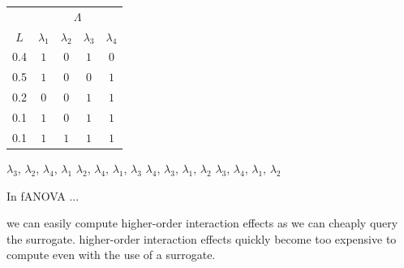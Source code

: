 \documentclass{exam}
\begin{document}
\begin{questions}
      \begin{tabular}{c|cccc}
          & \multicolumn{4}{c}{$\Lambda$} \\
          $L$ & $\lambda_1$ & $\lambda_2$ & $\lambda_3$ & $\lambda_4$ \\
          \hline %
          0.4 & $1$ & $0$ & $1$ & $0$ \\ %
          0.5 & $1$ & $0$ & $0$ & $1$ \\ %
          0.2 & $0$ & $0$ & $1$ & $1$ \\ %
          0.1 & $1$ & $0$ & $1$ & $1$ \\
          0.1 & $1$ & $1$ & $1$ & $1$ \\ %
      \end{tabular}
\begin{choices}
    \choice $\lambda_3$, $\lambda_2$, $\lambda_4$, $\lambda_1$
    \choice $\lambda_2$, $\lambda_4$, $\lambda_1$, $\lambda_3$
    \choice $\lambda_4$, $\lambda_3$, $\lambda_1$, $\lambda_2$
    \choice $\lambda_3$, $\lambda_4$, $\lambda_1$, $\lambda_2$ %
\end{choices}

\question In fANOVA ...
\begin{choices}
    \choice we can easily compute higher-order interaction effects as we can cheaply query the surrogate.
    \choice higher-order interaction effects quickly become too expensive to compute even with the use of a surrogate. %
\end{choices}

	\end{questions}
\end{document}
